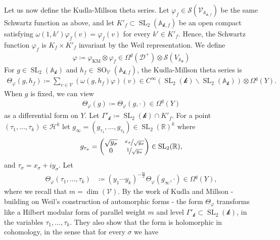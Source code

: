 \documentclass[11pt]{article} %
\newcommand{\8}{\infty}
\newcommand{\kbf}{\mathcal{k}}
\newcommand{\SO}{\operatorname{SO}}
\newcommand{\SL}{\operatorname{SL}}
\newcommand{\KM}{\operatorname{KM}}
\newcommand{\D}{\mathcal{D}}
\newcommand{\HH}{\mathscr{H}}
\newcommand{\R}{\mathbb{R}}
\newcommand{\A}{\mathbb{A}}
\newcommand{\Scal}{\mathcal{S}}
\newcommand{\Vcal}{\mathcal{V}}
\newcommand{\fin}{f}
\theoremstyle{mytheoremstyle}
\theoremstyle{remark}
\numberwithin{equation}{section}
\begin{document}
\subsubsection{} Let us now define the Kudla-Millson theta series. Let $\varphi_\fin \in \Scal(\Vcal_{\A_{\kbf,\fin}})$ be the same Schwartz function as above, and let $K'_\fin \subset \SL_2(\A_{\kbf,\fin})$ be an open compact satisfying $\omega(1,k')\varphi_\fin(v)=\varphi_\fin(v)$ for every $k' \in K'_\fin$. Hence, the Schwartz function $\varphi_\fin$ is $K_\fin \times K'_\fin$ invariant by the Weil representation. We define
\begin{align}
    \varphi \coloneqq \varphi_{\KM} \otimes \varphi_\fin \in \Omega^q(\D^+) \otimes \Scal(V_{\A_\kbf})
\end{align}
For $g \in \SL_2(\A_\kbf)$ and $h_\fin \in \SO_\Vcal(\A_{\kbf,\fin})$, the Kudla-Millson theta series is
\begin{align} \label{thetakernel}
    \Theta_\varphi(g,h_\fin) \coloneqq  \sum_{v \in \Vcal} (\omega(g,h_\fin)\varphi )(v) \in C^\8 \left ( \SL_2(\kbf)\backslash \SL_2(\A_\kbf)\right ) \otimes \Omega^q(Y).
\end{align}
When $g$ is fixed, we can view 
\begin{align}
    \Theta_\varphi(g) \coloneqq \Theta_\varphi(g, \cdot) \in \Omega^q(Y)
\end{align}
as a differential form on $Y$. Let $\Gamma'_\kbf \coloneqq \SL_2(\kbf) \cap K'_\fin$. For a point $(\tau_1, \dots, \tau_k)\in \HH^k$ let $g_{\8}=(g_{\tau_1}, \dots, g_{\tau_k}) \in \SL_2(\R)^k$ where
\begin{align}
    g_{\tau_\sigma} = \begin{pmatrix}
        \sqrt{y_\sigma} & \nicefrac{x_\sigma}{\sqrt{y_\sigma}} \\ 0 & \nicefrac{1}{\sqrt{y_\sigma}}
    \end{pmatrix} \in \SL_2(\R),
\end{align}
and $\tau_\sigma=x_\sigma+iy_\sigma$. Let
\begin{align} \label{kmlift2}
    \Theta_\varphi(\tau_1, \dots, \tau_k) & \coloneqq (y_1 \cdots y_k)^{-\frac{m}{2}} \Theta_\varphi(g_\8,\cdot) \in \Omega^q(Y),
\end{align}
where we recall that $m=\dim(\Vcal)$. By the work of Kudla and Millson - building on Weil's construction of automorphic forms - the form $\Theta_\varphi$ transforms like a Hilbert modular form of parallel weight $m$ and level $\Gamma'_\kbf \subset \SL_2(\kbf)$, in the variables $\tau_1, \dots, \tau_k$. They also show that the form is holomorphic in cohomology, in the sense that for every $\sigma$ we have
\end{document}
